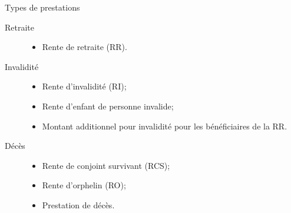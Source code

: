 \documentclass[10pt, french]{article}
\begin{document}
\begin{multicols*}{3}
\begin{conceptgen}{Types de prestations}
\begin{description}
	\item[Retraite]	
		\begin{itemize}[leftmargin = *]
		\item	Rente de retraite (RR).
		\end{itemize}
	\item[Invalidité]	
		\begin{itemize}[leftmargin = *]
		\item	Rente d'invalidité (RI);
		\item	Rente d'enfant de personne invalide;
		\item	Montant additionnel pour invalidité pour les bénéficiaires de la RR.
		\end{itemize}
	\item[Décès]	
		\begin{itemize}[leftmargin = *]
		\item	Rente de conjoint survivant (RCS);
		\item	Rente d'orphelin (RO);
		\item	Prestation de décès.
		\end{itemize}
\end{description}
\end{conceptgen}


\end{multicols*}
\end{document}

